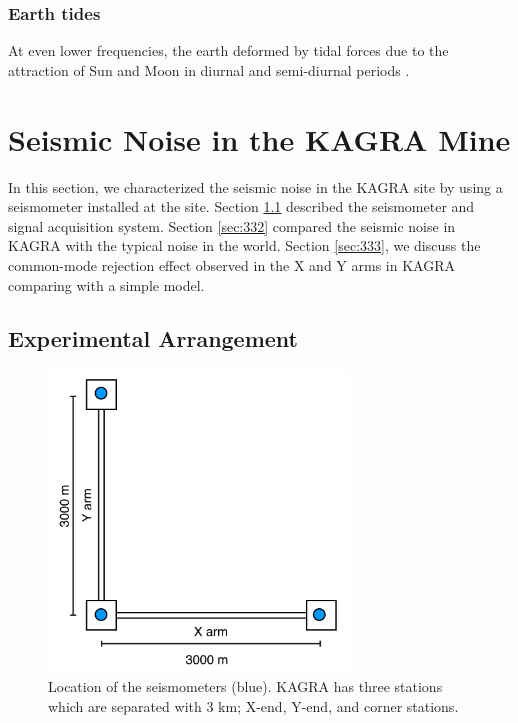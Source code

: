 \subsubsection{Earth tides}
At even lower frequencies, the earth deformed by tidal forces due to the attraction of Sun and Moon in diurnal and semi-diurnal periods \cite{agnew2005earth}. 



\newpage
\section{Seismic Noise in the KAGRA Mine} \label{sec:33}
In this section, we characterized the seismic noise in the KAGRA site by using a seismometer installed at the site. Section \ref{sec:331} described the seismometer and signal acquisition system. Section \ref{sec:332} compared the seismic noise in KAGRA with the typical noise in the world. Section \ref{sec:333}, we discuss the common-mode rejection effect observed in the X and Y arms in KAGRA comparing with a simple model.

\subsection{Experimental Arrangement}\label{sec:331}
\begin{figure}[h]
  \begin{center}   
    \includegraphics[width=8cm]{./img_chap3/img328a.png}
    \caption{Location of the seismometers (blue). KAGRA has three stations which are separated with 3 km; X-end, Y-end, and corner stations.}\label{img:img328a}
  \end{center}
\end{figure}

